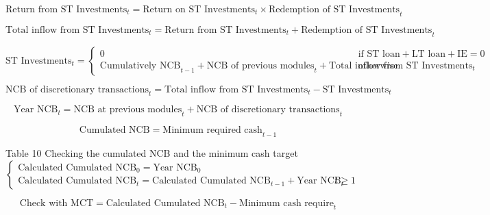 \documentclass[12pt]{article}
\numberwithin{equation}{section}
\begin{document}
\begin{equation}
	\text{Return from ST Investments}_{t} = \text{Return on ST Investments}_{t} \times \text{Redemption of ST Investments}_{t}
\end{equation}

\begin{equation}
	\text{Total inflow from ST Investments}_{t} = \text{Return from ST Investments}_{t} + \text{Redemption of ST Investments}_{t}
\end{equation}

\begin{equation}
	\text{ST Investments}_{t} = 
	\begin{cases}
		0 & \text{if } \text{ST loan} + \text{LT loan} + \text{IE} = 0 \\
		\text{Cumulatively NCB}_{t-1} + \text{NCB of previous modules}_{t} + \text{Total inflow from ST Investments}_{t} & \text{otherwise}
	\end{cases}
\end{equation}

\begin{equation}
	\text{NCB of discretionary transactions}_{t} = \text{Total inflow from ST Investments}_{t} - \text{ST Investments}_{t}
\end{equation}

\begin{equation}
	\text{Year NCB}_{t} = \text{NCB at previous modules}_{t} + \text{NCB of discretionary transactions}_{t}
\end{equation}

\begin{equation}
	\text{Cumulated NCB} = \text{Minimum required cash}_{t-1}
\end{equation}



Table 10 Checking the cumulated NCB and the minimum cash target
\begin{equation}
	\begin{cases}
		\text{Calculated Cumulated NCB}_{0} = \text{Year NCB}_{0} &  \\
		\text{Calculated Cumulated NCB}_{t} = \text{Calculated Cumulated NCB}_{t-1} +  \text{Year NCB}_{t} & t \geq 1
	\end{cases}
\end{equation}

\begin{equation}
	\text{Check with MCT} = \text{Calculated Cumulated NCB}_{t} - \text{Minimum cash require}_{t}
\end{equation}
\end{document}
